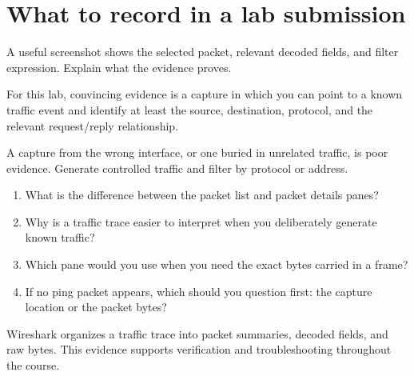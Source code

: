 \section{What to record in a lab submission}
A useful screenshot shows the selected packet, relevant decoded fields, and filter expression. Explain what the evidence proves.

\begin{verification}
For this lab, convincing evidence is a capture in which you can point to a known traffic event and identify at least the source, destination, protocol, and the relevant request/reply relationship.
\end{verification}

\begin{pitfall}
A capture from the wrong interface, or one buried in unrelated traffic, is poor evidence. Generate controlled traffic and filter by protocol or address.
\end{pitfall}

\begin{quickcheck}
\begin{enumerate}
\item What is the difference between the packet list and packet details panes?
\item Why is a traffic trace easier to interpret when you deliberately generate known traffic?
\item Which pane would you use when you need the exact bytes carried in a frame?
\item If no ping packet appears, which should you question first: the capture location or the packet bytes?
\end{enumerate}
\end{quickcheck}

\begin{chapterrecap}
Wireshark organizes a traffic trace into packet summaries, decoded fields, and raw bytes. This evidence supports verification and troubleshooting throughout the course.
\end{chapterrecap}


